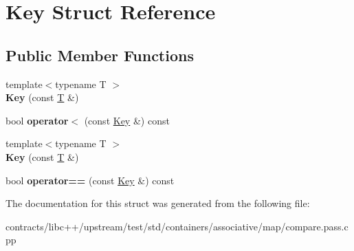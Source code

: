\hypertarget{struct_key}{}\section{Key Struct Reference}
\label{struct_key}
\subsection*{Public Member Functions}
\begin{DoxyCompactItemize}
\item 
\mbox{\label{struct_key_a093b8e4e449e7a81b489f8e9e9f8207e}} 
{\footnotesize template$<$typename T $>$ }\\{\bfseries Key} (const \mbox{\hyperlink{struct_t}{T}} \&)
\item 
\mbox{\label{struct_key_acdbd7ec8f1a19c3d4ae98d656293ef61}} 
bool {\bfseries operator$<$} (const \mbox{\hyperlink{struct_key}{Key}} \&) const
\item 
\mbox{\label{struct_key_a093b8e4e449e7a81b489f8e9e9f8207e}} 
{\footnotesize template$<$typename T $>$ }\\{\bfseries Key} (const \mbox{\hyperlink{struct_t}{T}} \&)
\item 
\mbox{\label{struct_key_a8cb85e358786ea8bf137a68fa8e72307}} 
bool {\bfseries operator==} (const \mbox{\hyperlink{struct_key}{Key}} \&) const
\end{DoxyCompactItemize}


The documentation for this struct was generated from the following file\+:\begin{DoxyCompactItemize}
\item 
contracts/libc++/upstream/test/std/containers/associative/map/compare.\+pass.\+cpp\end{DoxyCompactItemize}
